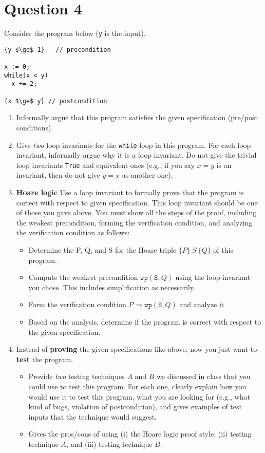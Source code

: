 \documentclass[11pt]{article}
\newcommand{\code}[1]{\texttt{#1}}
\begin{document}
\section{Question 4}

Consider the program below (\texttt{y} is the input). 
\begin{lstlisting}
{y $\ge$ 1}   // precondition

x := 0;
while(x < y)
  x += 2;

{x $\ge$ y} // postcondition
\end{lstlisting}


\begin{enumerate}
\item Informally argue that this program satisfies the given specification (pre/post conditions). 

\item Give \emph{two} loop invariants for the \code{while} loop in this program. For each loop invariant, informally argue why it is a loop invariant.  Do not give the trivial loop invariants \code{True} and equivalent ones (e.g., if you say $x = y$ is an invariant, then do not give $y = x$ as another one).
  
\item \textbf{Hoare logic}  Use a loop invariant to formally prove that the program is correct with respect to given specification. This loop invariant should be one of those you gave above. You must show all the steps of the proof, including the weakest precondition, forming the verification condition, and analyzing the verification condition as follows:
  \begin{itemize}
    \item Determine the P, Q, and S for the Hoare triple $\{P\} ~S~ \{Q\}$ of this program.
    \item Compute the weakest precondition $\code{wp}(\code{S}, Q)$ using the loop invariant you chose.  This includes simplification as necessarily.
    \item Form the verification condition $P \Rightarrow \code{wp}(\code{S}, Q)$ and analyze it
    \item Based on the analysis, determine if the program is correct with respect to the given specification.
  \end{itemize}

\item Instead of \textbf{proving} the given specifications like above, now you just want to \textbf{test} the program.
    \begin{itemize}
    \item Provide \emph{two} testing techniques $A$ and $B$ we discussed in class that you could use to test this program.  For each one, clearly explain how you would use it to test this program, what you are looking for (e.g., what kind of bugs, violation of postcondition), and gives examples of test inputs that the technique would suggest.
    \item Gives the pros/cons of using (i) the Hoare logic proof style, (ii) testing technique $A$, and (iii) testing technique $B$.
\end{itemize}
\end{enumerate}
\end{document}
